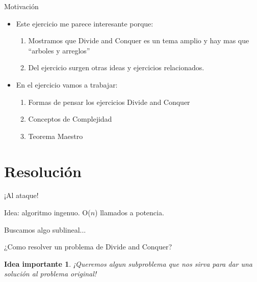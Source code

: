 \documentclass[pdf]{beamer}
\newcommand{\quotes}[1]{``#1''}
\newtheorem{idea}{Idea importante}
\begin{document}
\begin{frame}{Motivación}
    \begin{itemize}
        \item Este ejercicio me parece interesante porque:
        \begin{enumerate}
            \vspace{1em}
            \item Mostramos que Divide and Conquer es un tema amplio y hay mas que \quotes{arboles y arreglos}
            \vspace{1em}
            \item Del ejercicio surgen otras ideas y ejercicios relacionados.
        \end{enumerate}
        \vspace{1em}
            
        \item En el ejercicio vamos a trabajar:
        \begin{enumerate}
            \vspace{1em}
            \item Formas de pensar los ejercicios Divide and Conquer
            \vspace{1em}
            \item Conceptos de Complejidad
            \vspace{1em}
            \item Teorema Maestro
        \end{enumerate}
    \end{itemize}
\end{frame}

\section{Resolución}

\begin{frame}{¡Al ataque!}
    \par{Idea: \pause algoritmo ingenuo. \pause \alert{O($n$)} llamados a potencia.}
    \pause
    \vspace{1em}
    \par{Buscamos algo sublineal...}
    \pause
    
    \vspace{1em}
    
    ¿Como resolver un problema de Divide and Conquer?
    
    \pause
    
    \begin{idea}
	¡Queremos algun subproblema que nos sirva para dar una solución al problema original!
    \end{idea}
\end{frame}
\end{document}
